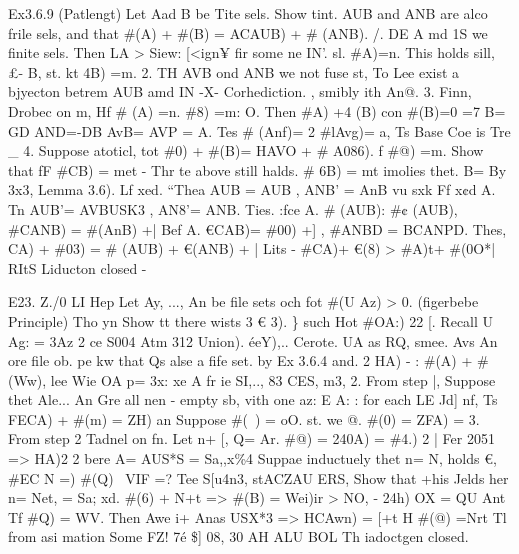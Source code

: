 \documentclass[a4paper,12pt]{article}
\begin{document}
    Ex3.6.9 (Patlengt)  Let Aad B be Tite sels.  Show tint. AUB and ANB are alco frile sels,  and that \#(A) + \#(B) = ACAUB) + \# (ANB).    /. DE A md 1S we finite sels. Then LA > Siew: [<ign¥ fir some ne IN’.  sl. \#A)=n. This holds sill, £- B, st. kt 4B) =m.    2. TH AVB ond ANB we not fuse st, To Lee exist a bjyecton  betrem AUB amd IN -X- Corhediction. , smibly ith An@.  3. Finn, Drobec on m, Hf \# (A) =n. \#8) =m: O.  Then \#A) +4 (B) con  \#(B)=0 =7 B= GD AND=-DB  AvB= AVP = A.  Tes \# (Anf)= 2  \#lAvg)= a,    Ts Base Coe is Tre \_    4. Suppose atoticl, tot \#0) + \#(B)= HAVO + \# A086).  f \#@) =m.  Show that fF \#CB) = met - Thr te above still halds.  \# 6B) = mt imolies thet. B= By 3x3, Lemma 3.6).  Lf xed. “Thea AUB = AUB , ANB’ = AnB vu sxk  Ff x¢d A. Tn AUB'= AVBUSK3 , AN8’= ANB.  Ties. :fce A. \# (AUB): \#¢ (AUB), \#CANB) = \#(AnB) +|  Bef A. €CAB)= \#00) +] , \#ANBD = BCANPD.  Thes, CA) + \#03) = \# (AUB) + €(ANB) + | Lits -    \#CA)+ €(8) > \#A)t+ \#(0O*| RItS    Liducton closed - 

\vspace{10pt}

\par

\vspace{10pt}

    E23. Z./0 LI Hep    Let Ay, ..., An be file sets och fot \#(U Az) > 0. (figerbebe Principle)  Tho yn  Show tt there wists 3 € 3). \} such Hot \#OA:) 22  [. Recall U Ag: = 3Az 2 ce S004 Atm 312 Union).  éeY),..    Cerote. UA as RQ, smee. Avs An ore file ob.    pe kw that Qs alse a fife set. by Ex 3.6.4 and.    2 HA) - : \#(A) + \# (Ww), lee Wie OA p= 3x: xe A fr ie SI,.., 83  CES, m3,  2. From step |, Suppose thet Ale... An Gre all nen - empty sb,  vith one az: E A: : for each LE Jd] nf,  Ts FECA) + \#(m) = ZH) an  Suppose \#(~) = oO. st. we @. \#(0) = ZFA) =    3. From step 2    Tadnel on fn. Let n+ [, Q= Ar. \#@) = 240A) = \#4.) 2 |    Fer 2051 => HA)2 2 bere A= AUS*S = Sa,,x\%4  Suppae inductuely thet n= N, holds €, \#EC\> N =) \#(Q)~ VIF    =? Tee S[u4n3, stACZAU ERS,  Show that +his Jelds her n= Net, = Sa; xd.  \#(6) + N+t => \#(B) = Wei)ir > NO,  - 24h) OX = QU Ant  Tf \#Q) = WV. Then    Awe i+ Anas USX*3 => HCAwn) = [+t    H \#(@) =Nrt Tl from asi mation Some FZ! 7é \$]    08, 30 AH ALU BOL  Th iadoctgen closed. 

\vspace{10pt}

\par

\vspace{10pt}
\end{document}
